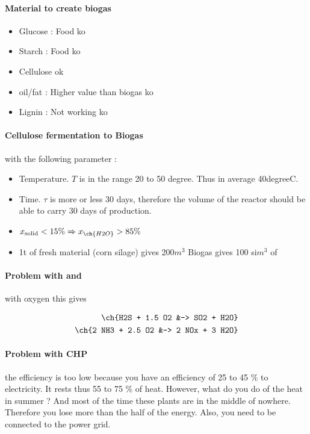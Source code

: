 \documentclass[10pt,a4paper]{article}
\begin{document}
\paragraph{Material to create biogas}
\begin{itemize}
\item Glucose : Food {\color{red}ko}
\item Starch : Food {\color{red}ko}
\item Cellulose {\color{green}ok}
\item oil/fat : Higher value than biogas {\color{red}ko}
\item Lignin : Not working {\color{red}ko}
\end{itemize}

\paragraph{Cellulose fermentation to Biogas}

with the following parameter :

\begin{itemize}
\item Temperature. $T$ is in the range 20 to 50 degree. Thus in average 40\si{degree}C.
\item Time. $\tau$ is more or less 30 days, therefore the volume of the reactor should be able to carry 30 days of production.
\item $x_{\text{solid}} < 15 \% \Rightarrow x_{\ch{H2O}}> 85 \%$
\item 1t of fresh material (corn silage) gives 200$m^3$ Biogas gives 100 si$m^3$ of 
\end{itemize}

\paragraph{Problem with  and } with oxygen this gives

\begin{align*}
\ch{H2S + 1.5 O2 &-> SO2 + H2O} \\
\ch{2 NH3 + 2.5 O2 &-> 2 NOx + 3 H2O}
\end{align*}

\paragraph{Problem with CHP}the efficiency is too low because you have an efficiency of 25 to 45 \% to electricity. It rests thus 55 to 75 \% of heat. However, what do you do of the heat in summer ? And most of the time these plants are in the middle of nowhere. Therefore you lose more than the half of the energy. Also, you need to be connected to the power grid.
\end{document}
